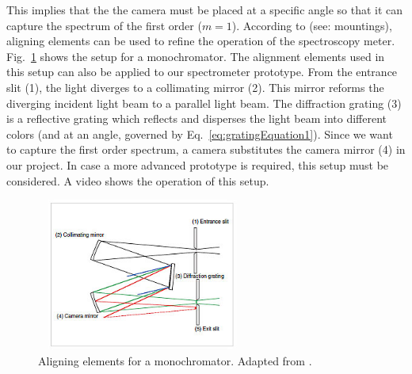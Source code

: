 \documentclass[aps,twocolumn,twoside,secnumarabic,balancelastpage,amsmath,amssymb,nofootinbib,hyperref=pdftex]{revtex4}
\begin{document}
This implies that the the camera must be placed at a specific angle so that it can capture the spectrum of the first order ($m=1$). According to \cite{mchr} (see: mountings), aligning elements can be used to refine the operation of the spectroscopy meter. Fig.~\ref{fig:sp_m} shows the setup for a monochromator. The alignment elements used in this setup can also be applied to our spectrometer prototype. From the entrance slit (1), the light diverges to a collimating mirror (2). This mirror reforms the diverging incident light beam to a parallel light beam. The diffraction grating (3) is a reflective grating which reflects and disperses the light beam into different colors (and at an angle, governed by Eq.~\ref{eq:gratingEquation1}). Since we want to capture the first order spectrum, a camera substitutes the camera mirror (4) in our project. In case a more advanced prototype is required, this setup must be considered. A video \cite{spwo} shows the operation of this setup.

\begin{figure}[htb]
\includegraphics[width=7cm, height=5cm]{mountings.jpg}
\caption{Aligning elements for a monochromator. Adapted from \cite{mchr}.
\label{fig:sp_m}}
\end{figure}
\end{document}
